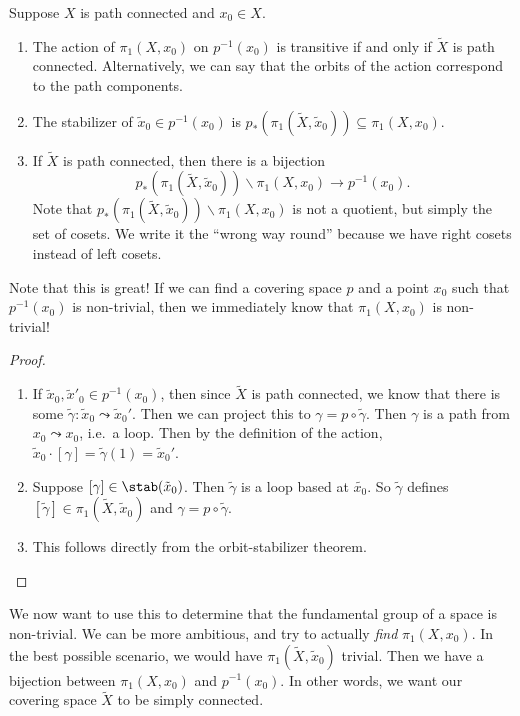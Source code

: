 \documentclass[a4paper]{article}
\begin{document}
\begin{lemma}
  Suppose $X$ is path connected and $x_0 \in X$.
  \begin{enumerate}
    \item The action of $\pi_1(X, x_0)$ on $p^{-1}(x_0)$ is transitive if and only if $\tilde{X}$ is path connected. Alternatively, we can say that the orbits of the action correspond to the path components.
    \item The stabilizer of $\tilde{x}_0 \in p^{-1}(x_0)$ is $p_*(\pi_1(\tilde{X}, \tilde{x}_0)) \subseteq \pi_1(X, x_0)$.
    \item If $\tilde{X}$ is path connected, then there is a bijection
      \[
        p_* (\pi_1(\tilde{X}, \tilde{x}_0))\backslash \pi_1(X, x_0) \to p^{-1}(x_0).
      \]
      Note that $p_*(\pi_1(\tilde{X}, \tilde{x}_0))\backslash \pi_1(X, x_0)$ is not a quotient, but simply the set of cosets. We write it the ``wrong way round'' because we have right cosets instead of left cosets.
  \end{enumerate}
\end{lemma}
Note that this is great! If we can find a covering space $p$ and a point $x_0$ such that $p^{-1}(x_0)$ is non-trivial, then we immediately know that $\pi_1(X, x_0)$ is non-trivial!

\begin{proof}\leavevmode
  \begin{enumerate}
    \item If $\tilde{x}_0, \tilde{x}'_0 \in p^{-1}(x_0)$, then since $\tilde{X}$ is path connected, we know that there is some $\tilde{\gamma}: \tilde{x}_0 \leadsto \tilde{x}_0'$. Then we can project this to $\gamma = p\circ \tilde{\gamma}$. Then $\gamma$ is a path from $x_0 \leadsto x_0$, i.e.\ a loop. Then by the definition of the action, $\tilde{x}_0 \cdot [\gamma] = \tilde{\gamma}(1) = \tilde{x}_0'$.

    \item Suppose $[\gamma] \in \stab(\tilde{x}_0)$. Then $\tilde{\gamma}$ is a loop based at $\tilde{x_0}$. So $\tilde{\gamma}$ defines $[\tilde{\gamma}] \in \pi_1(\tilde{X}, \tilde{x}_0)$ and $\gamma = p\circ \tilde{\gamma}$.

    \item This follows directly from the orbit-stabilizer theorem.\qedhere
  \end{enumerate}
\end{proof}

We now want to use this to determine that the fundamental group of a space is non-trivial. We can be more ambitious, and try to actually \emph{find} $\pi_1(X, x_0)$. In the best possible scenario, we would have $\pi_1(\tilde{X}, \tilde{x}_0)$ trivial. Then we have a bijection between $\pi_1(X, x_0)$ and $p^{-1}(x_0)$. In other words, we want our covering space $\tilde{X}$ to be simply connected.
\end{document}
